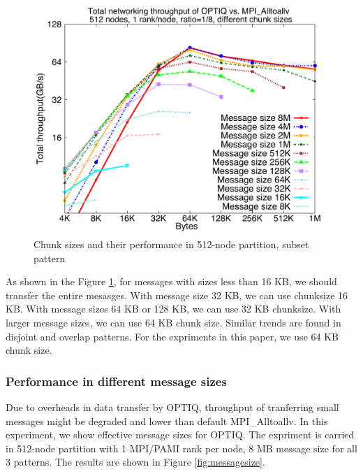 \begin{figure}[!htb]
\vspace{-0.1in}
\centering
\includegraphics[scale=0.30]{figures/87_chunksize.pdf}
\vspace{-0.1in}
\caption{Chunk sizes and their performance in 512-node partition, subset pattern}
\vspace{-0.1in}
\label{fig:chunksize}
\end{figure}

As shown in the Figure \ref{fig:chunksize}, for messages with sizes less than 16 KB, we should transfer the entire mesasges. With message size 32 KB, we can use chunksize 16 KB. With message sizes 64 KB or 128 KB, we can use 32 KB chunksize. With larger message sizes, we can use 64 KB chunk size. Similar trends are found in disjoint and overlap patterns. For the expriments in this paper, we use 64 KB chunk size. 

\subsubsection{Performance in different message sizes}

Due to overheads in data transfer by OPTIQ, throughput of tranferring small messages might be degraded and lower than default MPI\_Alltoallv. In this experiment, we show effective message sizes for OPTIQ. The expriment is carried in 512-node partition with 1 MPI/PAMI rank per node, 8 MB message size for all 3 patterns. The results are shown in Figure \ref{fig:messagesize}.

